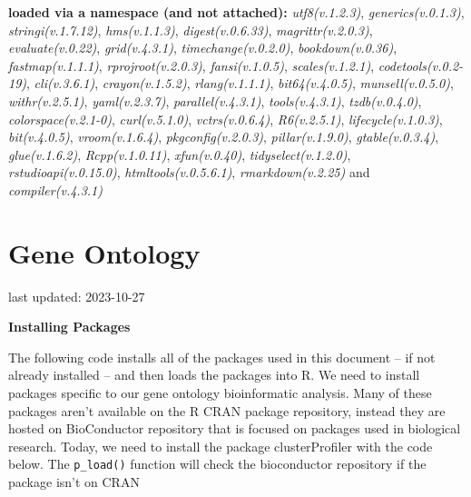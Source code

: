 \documentclass[
]{book}
\begin{document}
\textbf{loaded via a namespace (and not attached):}
\emph{utf8(v.1.2.3)}, \emph{generics(v.0.1.3)}, \emph{stringi(v.1.7.12)}, \emph{hms(v.1.1.3)}, \emph{digest(v.0.6.33)}, \emph{magrittr(v.2.0.3)}, \emph{evaluate(v.0.22)}, \emph{grid(v.4.3.1)}, \emph{timechange(v.0.2.0)}, \emph{bookdown(v.0.36)}, \emph{fastmap(v.1.1.1)}, \emph{rprojroot(v.2.0.3)}, \emph{fansi(v.1.0.5)}, \emph{scales(v.1.2.1)}, \emph{codetools(v.0.2-19)}, \emph{cli(v.3.6.1)}, \emph{crayon(v.1.5.2)}, \emph{rlang(v.1.1.1)}, \emph{bit64(v.4.0.5)}, \emph{munsell(v.0.5.0)}, \emph{withr(v.2.5.1)}, \emph{yaml(v.2.3.7)}, \emph{parallel(v.4.3.1)}, \emph{tools(v.4.3.1)}, \emph{tzdb(v.0.4.0)}, \emph{colorspace(v.2.1-0)}, \emph{curl(v.5.1.0)}, \emph{vctrs(v.0.6.4)}, \emph{R6(v.2.5.1)}, \emph{lifecycle(v.1.0.3)}, \emph{bit(v.4.0.5)}, \emph{vroom(v.1.6.4)}, \emph{pkgconfig(v.2.0.3)}, \emph{pillar(v.1.9.0)}, \emph{gtable(v.0.3.4)}, \emph{glue(v.1.6.2)}, \emph{Rcpp(v.1.0.11)}, \emph{xfun(v.0.40)}, \emph{tidyselect(v.1.2.0)}, \emph{rstudioapi(v.0.15.0)}, \emph{htmltools(v.0.5.6.1)}, \emph{rmarkdown(v.2.25)} and \emph{compiler(v.4.3.1)}

\hypertarget{gene-ontology}{%
\chapter{Gene Ontology}\label{gene-ontology}}

last updated: 2023-10-27

\textbf{Installing Packages}

The following code installs all of the packages used in this document -- if not already installed -- and then loads the packages into R. We need to install packages specific to our gene ontology bioinformatic analysis. Many of these packages aren't available on the R CRAN package repository, instead they are hosted on BioConductor repository that is focused on packages used in biological research. Today, we need to install the package clusterProfiler with the code below. The \texttt{p\_load()} function will check the bioconductor repository if the package isn't on CRAN
\end{document}
